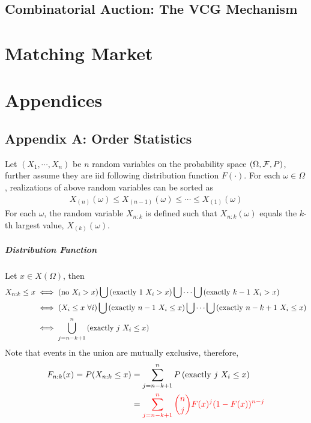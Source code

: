 \documentclass{book}
\begin{document}
	\section{Combinatorial Auction: The VCG Mechanism}
	
	
	\chapter{Matching Market}
	
	\chapter{Appendices}
	\section{Appendix A: Order Statistics}
	\begin{definition}
		Let $(X_1, \cdots, X_n)$ be $n$ random variables on the probability space $(\Omega, \mathcal{{F}}, P)$, further assume they are iid following distribution function $F(\cdot)$. For each $\omega \in \Omega$, realizations of above random variables can be sorted as
		\begin{align}
			X_{(n)}(\omega) \leq X_{(n-1)}(\omega) \leq \cdots \leq X_{(1)}(\omega)
		\end{align}
		For each $\omega$, the random variable $X_{n:k}$ is defined such that $X_{n:k}(\omega)$ equals the $k$-th largest value, $X_{(k)}(\omega)$.
	\end{definition}
	
	\paragraph{Distribution Function} Let $x \in X(\Omega)$, then 
	\begin{align}
		X_{n:k} \leq x
		&\iff (\text{{no $X_i > x$}}) \bigcup \left(\text{{exactly $1$ $X_i > x$}}\right) \bigcup  \cdots \bigcup \left(\text{{exactly $k-1$ $X_i > x$}}\right) \\
		&\iff (X_i \leq x\ \forall i) \bigcup \left(\text{{exactly $n-1$ $X_i \leq x$}}\right) \bigcup  \cdots \bigcup \left(\text{{exactly $n-k+1$ $X_i \leq x$}}\right) \\
		&\iff \bigcup_{j=n-k+1}^n \left(\text{{exactly $j$ $X_i \leq x$}}\right)
	\end{align}
	Note that events in the union are mutually exclusive, therefore,
	\begin{align}
		F_{n:k}(x) = P(X_{n:k} \leq x)
		&= \sum_{j=n-k+1}^n P\left(\text{{exactly $j$ $X_i \leq x$}}\right) \\
		&= \textcolor{red}{\sum_{j=n-k+1}^n \binom{n}{j} F(x)^j (1 - F(x))^{n-j}}
	\end{align}
\end{document}
